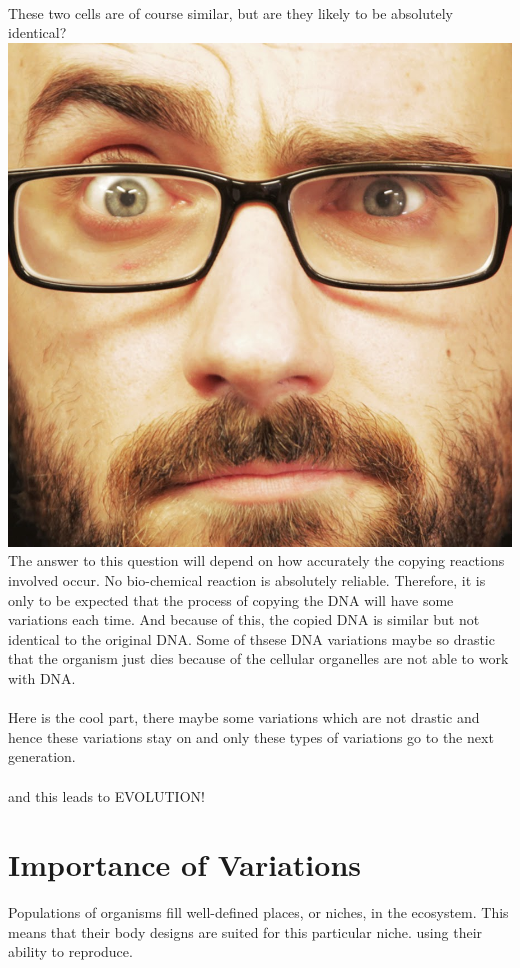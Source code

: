 \documentclass[A4]{article}
\newcommand{\vsauce}{\includegraphics[scale=0.015]{vsauce-eyes.jpg}}
\begin{document}
    \paragraph{}
    These two cells are of course similar, but are they likely to be absolutely identical? \vsauce
    The answer to this question will depend on how accurately the copying reactions involved occur. 
    No bio-chemical reaction is absolutely reliable. 
    Therefore, it is only to be expected that the process of copying the DNA will have some variations each time.
    And because of this, the copied DNA is similar but not identical to the original DNA.
    Some of thsese DNA variations maybe so drastic that the organism just dies because of the cellular organelles are not able to work with DNA. 
    \paragraph{}
    Here is the cool part, there maybe some variations which are not drastic and hence these variations stay on and only these types of variations go to the next generation.\\ 
    \paragraph{}
    \Huge{and this leads to EVOLUTION!}
    \section{Importance of Variations}
    Populations of organisms fill well-defined places, or niches, in the ecosystem. 
    This means that their body designs are suited for this particular niche. 
    using their ability to reproduce.
\end{document}
